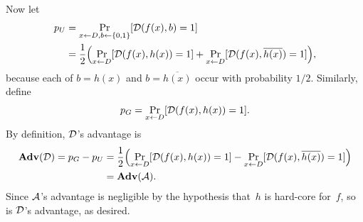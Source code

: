 \documentclass[11pt]{article}
\begin{document}
\begin{answer}
  Now let
  \begin{align*}
    p_{U}
    &= \Pr_{x \gets D, b \gets \bit}[\calD(f(x),b) = 1] \\
    &= \frac12 \parens*{\Pr_{x \gets D}[\calD(f(x),h(x)) = 1] + 
      \Pr_{x \gets D}[\calD(f(x), \overline{h(x)}) = 1]},
  \end{align*}
  because each of $b=h(x)$ and $b=\overline{h(x)}$ occur with probability $1/2$.
  Similarly, define
  \[ p_{G} = \Pr_{x \gets D}[\mathcal{D}(f(x), h(x))=1].
  \] By definition, $\mathcal{D}$'s advantage is
  \begin{align*}
    \advan(\calD) = p_{G}-p_{U}
    &= \frac12 \parens*{\Pr_{x \gets D}[\calD(f(x),
      h(x))=1] - \Pr_{x \gets D}[\calD(f(x),\overline{h(x)})=1]} \\
    &= \advan(\AdvA).
  \end{align*}
  Since $\mathcal{A}$'s advantage is negligible by the hypothesis that~$h$ is hard-core for~$f$, so is $\mathcal{D}$'s advantage, as desired.
\end{answer}
\end{document}
